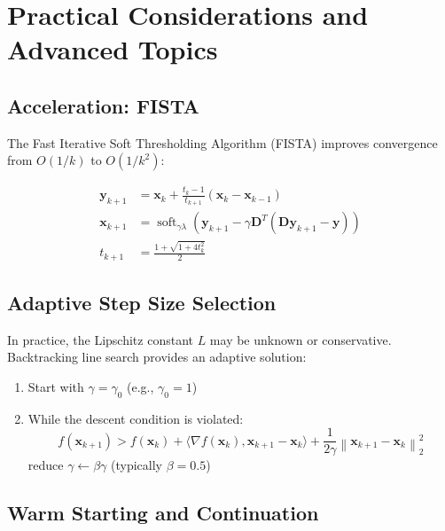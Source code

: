 \documentclass[12pt]{article}
\renewcommand{\vec}[1]{\mathbf{#1}}
\DeclareMathOperator{\soft}{soft}
\newcommand{\norm}[1]{\left\lVert#1\right\rVert}
\newcommand{\inner}[2]{\langle #1, #2 \rangle}
\theoremstyle{definition}
\begin{document}
\newpage
\section{Practical Considerations and Advanced Topics}

\subsection{Acceleration: FISTA}

The Fast Iterative Soft Thresholding Algorithm (FISTA) improves convergence from $O(1/k)$ to $O(1/k^2)$:

\begin{align}
    \vec{y}_{k+1} & = \vec{x}_k + \frac{t_k - 1}{t_{k+1}}(\vec{x}_k - \vec{x}_{k-1})                         \\
    \vec{x}_{k+1} & = \soft_{\gamma\lambda}(\vec{y}_{k+1} - \gamma\vec{D}^T(\vec{D}\vec{y}_{k+1} - \vec{y})) \\
    t_{k+1}       & = \frac{1 + \sqrt{1 + 4t_k^2}}{2}
\end{align}

\subsection{Adaptive Step Size Selection}

In practice, the Lipschitz constant $L$ may be unknown or conservative. Backtracking line search provides an adaptive solution:

\begin{enumerate}
    \item Start with $\gamma = \gamma_0$ (e.g., $\gamma_0 = 1$)
    \item While the descent condition is violated:
          \begin{equation}
              f(\vec{x}_{k+1}) > f(\vec{x}_k) + \inner{\nabla f(\vec{x}_k)}{\vec{x}_{k+1} - \vec{x}_k} + \frac{1}{2\gamma}\norm{\vec{x}_{k+1} - \vec{x}_k}_2^2
          \end{equation}
          reduce $\gamma \leftarrow \beta\gamma$ (typically $\beta = 0.5$)
\end{enumerate}

\subsection{Warm Starting and Continuation}
\end{document}
